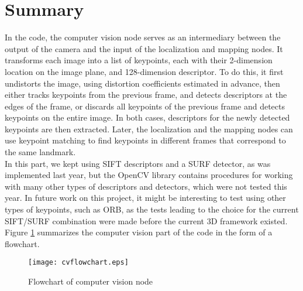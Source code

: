 \section{Summary}
In the code, the computer vision node serves as an intermediary between the output of the camera and the input of the localization and mapping nodes. It transforms each image into a list of keypoints, each with their 2-dimension location on the image plane, and 128-dimension descriptor. To do this, it first undistorts the image, using distortion coefficients estimated in advance, then either tracks keypoints from the previous frame, and detects descriptors at the edges of the frame, or discards all keypoints of the previous frame and detects keypoints on the entire image. In both cases, descriptors for the newly detected keypoints are then extracted. Later, the localization and the mapping nodes can use keypoint matching to find keypoints in different frames that correspond to the same landmark.\\

In this part, we kept using SIFT descriptors and a SURF detector, as was implemented last year, but the OpenCV library contains procedures for working with many other types of descriptors and detectors, which were not tested this year. In future work on this project, it might be interesting to test using other types of keypoints, such as ORB, as the tests leading to the choice for the current SIFT/SURF combination were made before the current 3D framework existed.\\
Figure \ref{fig:cvflowchart} summarizes the computer vision part of the code in the form of a flowchart.

\begin{figure}[H]
\centering
\texttt{[image: cvflowchart.eps]}
\caption{Flowchart of computer vision node}
\label{fig:cvflowchart}
\end{figure}
